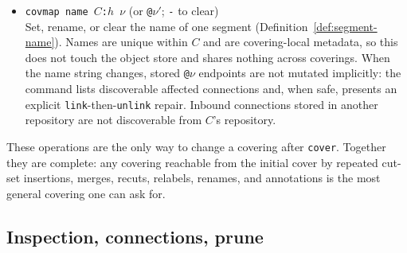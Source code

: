 \documentclass[11pt,a4paper]{article}
\begin{document}
\begin{itemize}[leftmargin=2em,itemsep=2pt]
\item \texttt{covmap name $C$:$h$ $\nu$} (or \texttt{@$\nu'$}; \texttt{-} to clear)\\
      Set, rename, or clear the name of one segment
      (Definition~\ref{def:segment-name}). Names are unique within $C$ and are
      covering-local metadata, so this does not touch the object store
      and shares nothing across coverings. When the name string changes,
      stored \texttt{@$\nu$} endpoints are not mutated implicitly: the
      command lists discoverable affected connections and, when safe,
      presents an explicit \texttt{link}-then-\texttt{unlink} repair.
      Inbound connections stored in another repository are not discoverable
      from $C$'s repository.
\end{itemize}

These operations are the only way to change a covering after
\texttt{cover}. Together they are complete: any covering reachable
from the initial cover by repeated cut-set insertions, merges, recuts,
relabels, renames, and annotations is the most general covering one can
ask for.

\subsection{Inspection, connections, prune}
\end{document}
